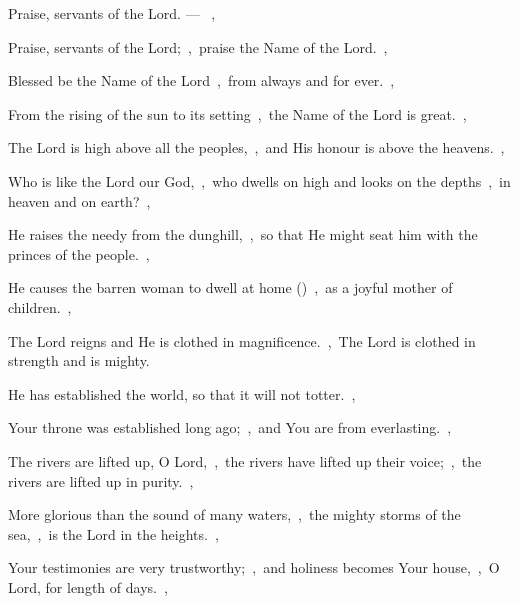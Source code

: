 \documentclass[12pt,twoside,a5paper]{article}
\begin{document}
\begin{halfparskip}
   Praise, servants of the Lord. --- ~\sep

  Praise, servants of the Lord;~\sep\ praise the Name of the Lord.~\sep

  Blessed be the Name of the Lord~\sep\ from always and for ever.~\sep

  From the rising of the sun to its setting~\sep\ the Name of the Lord is great.~\sep

  The Lord is high above all the peoples,~\sep\ and His honour is above the heavens.~\sep

  Who is like the Lord our God,~\sep\ who dwells on high and looks on the depths~\sep\ in heaven and on earth?~\sep

  He raises the needy from the dunghill,~\sep\ so that He might seat him with the princes of the people.~\sep

  He causes the barren woman to dwell at home ()~\sep\ as a joyful mother of children.~\sep

\end{halfparskip}

\begin{halfparskip}
   The Lord reigns and He is clothed in magnificence.~\sep\ The Lord is clothed in strength and is mighty.

  He has established the world, so that it will not totter.~\sep

  Your throne was established long ago;~\sep\ and You are from everlasting.~\sep

  The rivers are lifted up, O Lord,~\sep\ the rivers have lifted up their voice;~\sep\ the rivers are lifted up in purity.~\sep

  More glorious than the sound of many waters,~\sep\ the mighty storms of the sea,~\sep\ is the Lord in the heights.~\sep

  Your testimonies are very trustworthy;~\sep\ and holiness becomes Your house,~\sep\ O Lord, for length of days.~\sep
\end{halfparskip}
\end{document}
